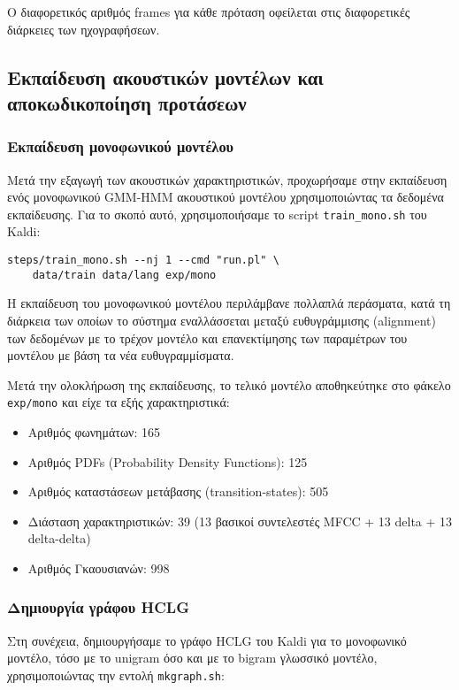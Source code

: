 \documentclass[a4paper,12pt]{article}
\begin{document}
Ο διαφορετικός αριθμός frames για κάθε πρόταση οφείλεται στις διαφορετικές διάρκειες των ηχογραφήσεων.

\subsection{Εκπαίδευση ακουστικών μοντέλων και αποκωδικοποίηση προτάσεων}

\subsubsection{Εκπαίδευση μονοφωνικού μοντέλου}

Μετά την εξαγωγή των ακουστικών χαρακτηριστικών, προχωρήσαμε στην εκπαίδευση ενός μονοφωνικού GMM-HMM ακουστικού μοντέλου χρησιμοποιώντας τα δεδομένα εκπαίδευσης. Για το σκοπό αυτό, χρησιμοποιήσαμε το script \verb|train_mono.sh| του Kaldi:

\begin{lstlisting}
steps/train_mono.sh --nj 1 --cmd "run.pl" \
    data/train data/lang exp/mono
\end{lstlisting}

Η εκπαίδευση του μονοφωνικού μοντέλου περιλάμβανε πολλαπλά περάσματα, κατά τη διάρκεια των οποίων το σύστημα εναλλάσσεται μεταξύ ευθυγράμμισης (alignment) των δεδομένων με το τρέχον μοντέλο και επανεκτίμησης των παραμέτρων του μοντέλου με βάση τα νέα ευθυγραμμίσματα.

Μετά την ολοκλήρωση της εκπαίδευσης, το τελικό μοντέλο αποθηκεύτηκε στο φάκελο \verb|exp/mono| και είχε τα εξής χαρακτηριστικά:
\begin{itemize}
    \item Αριθμός φωνημάτων: 165
    \item Αριθμός PDFs (Probability Density Functions): 125
    \item Αριθμός καταστάσεων μετάβασης (transition-states): 505
    \item Διάσταση χαρακτηριστικών: 39 (13 βασικοί συντελεστές MFCC + 13 delta + 13 delta-delta)
    \item Αριθμός Γκαουσιανών: 998
\end{itemize}

\subsubsection{Δημιουργία γράφου HCLG}

Στη συνέχεια, δημιουργήσαμε το γράφο HCLG του Kaldi για το μονοφωνικό μοντέλο, τόσο με το unigram όσο και με το bigram γλωσσικό μοντέλο, χρησιμοποιώντας την εντολή \verb|mkgraph.sh|:
\end{document}
